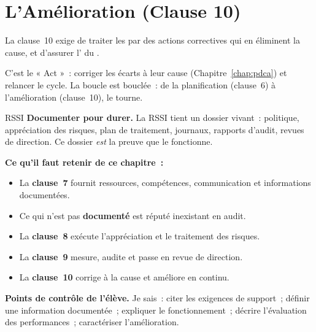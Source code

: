 \section{L'Amélioration (Clause 10)}
\label{sec:c09-amelioration}

\begin{boxdef}
La clause~10 exige de traiter les  par des actions
correctives qui en éliminent la cause, et d'assurer l' du .
\end{boxdef}

C'est le « Act »~: corriger les écarts à leur cause (Chapitre~\ref{chap:pdca})
et relancer le cycle. La boucle est bouclée~: de la planification (clause~6) à
l'amélioration (clause~10), le  tourne.

\begin{boxmetier}{RSSI}
\textbf{Documenter pour durer.} La RSSI tient un dossier vivant~: politique,
appréciation des risques, plan de traitement, journaux, rapports d'audit,
revues de direction. Ce dossier \emph{est} la preuve que le 
fonctionne.
\end{boxmetier}

\separateur

\begin{boxresume}
\textbf{Ce qu'il faut retenir de ce chapitre~:}
\begin{itemize}
    \item La \textbf{clause~7} fournit ressources, compétences, communication
          et informations documentées.
    \item Ce qui n'est pas \textbf{documenté} est réputé inexistant en audit.
    \item La \textbf{clause~8} exécute l'appréciation et le traitement des
          risques.
    \item La \textbf{clause~9} mesure, audite et passe en revue de direction.
    \item La \textbf{clause~10} corrige à la cause et améliore en continu.
\end{itemize}
\end{boxresume}

\begin{boxinfo}
\textbf{Points de contrôle de l'élève.} Je sais~: citer les exigences de
support~; définir une information documentée~; expliquer le fonctionnement~;
décrire l'évaluation des performances~; caractériser l'amélioration.
\end{boxinfo}

